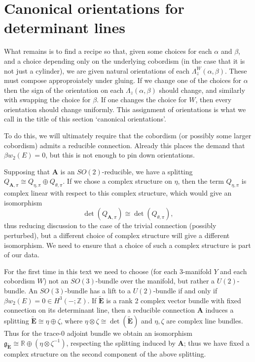 \documentclass{memo-l}
\theoremstyle{definition}
\theoremstyle{remark}
\numberwithin{section}{chapter}
\numberwithin{equation}{chapter}
\begin{document}
\section{Canonical orientations for determinant lines}\label{sec:or-canonical}
What remains is to find a recipe so that, given some choices for each $\alpha$ and $\beta$, and a choice depending only on the underlying cobordism (in the case that it is not just a cylinder), we are given natural orientations of each $\Lambda^W_z(\alpha, \beta)$. These must compose approproiately under gluing. If we change one of the choices for $\alpha$ then the sign of the orientation on each $\Lambda_z(\alpha, \beta)$ should change, and similarly with swapping the choice for $\beta$. If one changes the choice for $W$, then every orientation should change uniformly. This assignment of orientations is what we call in the title of this section `canonical orientations'.

To do this, we will ultimately require that the cobordism (or possibly some larger cobordism) admits a reducible connection. Already this places the demand that $\beta w_2(E) = 0$, but this is not enough to pin down orientations.

Supposing that $\mathbf{A}$ is an $SO(2)$-reducible, we have a splitting $Q_{\mathbf{A},\pi} \cong Q_{\eta, \pi} \oplus Q_{\theta, \pi}$. If we chose a complex structure on $\eta$, then the term $Q_{\eta, \pi}$ is complex linear with respect to this complex structure, which would give an isomorphism 
$$\det(Q_{\mathbf{A},\pi}) \cong \det(Q_{\theta, \pi}),$$ 
thus reducing discussion to the case of the trivial connection (possibly perturbed), but a different choice of complex structure will give a different isomorphism. We need to ensure that a choice of such a complex structure is part of our data.

For the first time in this text we need to choose (for each 3-manifold $Y$ and each cobordism $W$) not an $SO(3)$-bundle over the manifold, but rather a $U(2)$-bundle. An $SO(3)$-bundle has a lift to a $U(2)$-bundle if and only if $\beta w_2(E) = 0 \in H^3(-;\mathbb Z)$. If $\widetilde{\mathbf{E}}$ is a rank 2 complex vector bundle with fixed connection on its determinant line, then a reducible connection $\mathbf{A}$ induces a splitting $\widetilde{\mathbf{E}} \cong \eta \oplus \zeta$, where $\eta \otimes \zeta \cong \det(\widetilde{\mathbf{E}})$ and $\eta, \zeta$ are complex line bundles. Thus for the trace-$0$ adjoint bundle we obtain an isomorphism $\mathfrak g_{\widetilde{\mathbf{E}}} \cong \mathbb R \oplus (\eta \otimes \zeta^{-1})$, respecting the splitting induced by $\mathbf{A}$; thus we have fixed a complex structure on the second component of the above splitting.
\end{document}
